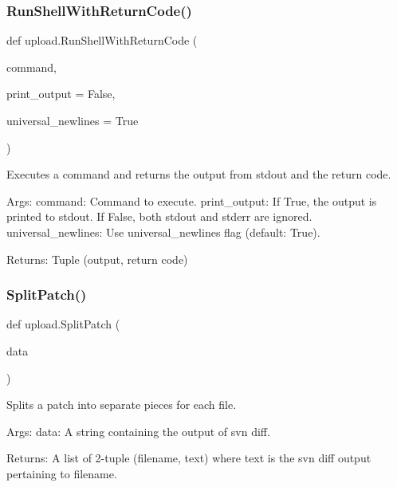 \mbox{\label{namespaceupload_afa542d3a5a4f4fce174a1c23644a9204}} 
\subsubsection{\texorpdfstring{Run\+Shell\+With\+Return\+Code()}{RunShellWithReturnCode()}}
{\footnotesize\ttfamily def upload.\+Run\+Shell\+With\+Return\+Code (\begin{DoxyParamCaption}\item[{}]{command,  }\item[{}]{print\+\_\+output = {\ttfamily False},  }\item[{}]{universal\+\_\+newlines = {\ttfamily True} }\end{DoxyParamCaption})}

\begin{DoxyVerb}Executes a command and returns the output from stdout and the return code.

Args:
  command: Command to execute.
  print_output: If True, the output is printed to stdout.
                If False, both stdout and stderr are ignored.
  universal_newlines: Use universal_newlines flag (default: True).

Returns:
  Tuple (output, return code)
\end{DoxyVerb}
 \mbox{\label{namespaceupload_a9dd260785ca4cc97e245234811ef1949}} 
\subsubsection{\texorpdfstring{Split\+Patch()}{SplitPatch()}}
{\footnotesize\ttfamily def upload.\+Split\+Patch (\begin{DoxyParamCaption}\item[{}]{data }\end{DoxyParamCaption})}

\begin{DoxyVerb}Splits a patch into separate pieces for each file.

Args:
  data: A string containing the output of svn diff.

Returns:
  A list of 2-tuple (filename, text) where text is the svn diff output
    pertaining to filename.
\end{DoxyVerb}
 \mbox{\label{namespaceupload_a79ce84c196c018f3b0c7ff7a9b626b58}} 
